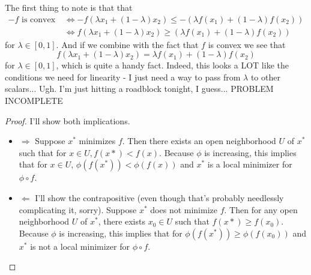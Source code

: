 \documentclass[12pt]{article}
\newenvironment{problem}[2][Problem]{\begin{trivlist}
\item[\hskip \labelsep {\bfseries #1}\hskip \labelsep {\bfseries #2.}]}{\end{trivlist}}
\theoremstyle{definition}
\theoremstyle{definition}
\theoremstyle{definition}
\theoremstyle{definition}
\begin{document}
\begin{problem}{7.20}
The first thing to note is that that 
\begin{align*}
-f \text{ is convex } &\iff -f(\lambda x_ 1 + (1- \lambda)x_2) \leq -(\lambda f(x_1) + (1 - \lambda) f(x_2)) \\ 
&\iff f(\lambda x_ 1 + (1- \lambda)x_2) \geq (\lambda f(x_1) + (1 - \lambda) f(x_2))
\end{align*}
for $\lambda \in [0,1]$. And if we combine with the fact that $f$ is convex we see that
$$
f(\lambda x_ 1 + (1- \lambda)x_2) = \lambda f(x_1) + (1 - \lambda) f(x_2)
$$
for $\lambda \in [0,1]$, which is quite a handy fact.
Indeed, this looks a LOT like the conditions we need for linearity - I just need a way to pass from $\lambda$ to other scalars... Ugh. I'm just hitting a roadblock tonight, I guess... PROBLEM INCOMPLETE
\end{problem}

\begin{problem}{7.21}\begin{proof} I'll show both implications.
\begin{itemize}
\item $\Rightarrow$
Suppose $x^*$ minimizes $f$. Then there exists an open neighborhood $U$ of $x^*$ such that for $x \in U ,f(x*) < f(x)$. Because $\phi$ is increasing, this implies that for $x \in U$, $\phi(f(x^*)) < \phi(f(x))$ and $x^*$ is a local minimizer for $\phi \circ f$. 
\item $\Leftarrow$ I'll show the contrapositive (even though that's probably needlessly complicating it, sorry). Suppose $x^*$ does not minimize $f$. Then for any open neighborhood $U$ of $x^*$, there exists $x_0 \in U$ such that  $f(x*) \geq f(x_0)$. Because $\phi$ is increasing, this implies that for $\phi(f(x^*)) \geq \phi(f(x_0))$ and $x^*$ is not a local minimizer for $\phi \circ f$.
\end{itemize}
\end{proof}
\end{problem}
\end{document}
